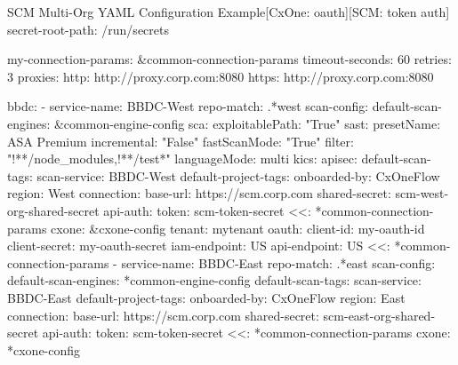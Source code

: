 \begin{code}{SCM Multi-Org YAML Configuration Example}{[CxOne: oauth]}{[SCM: token auth]}
secret-root-path: /run/secrets

my-connection-params: &common-connection-params
    timeout-seconds: 60
    retries: 3
    proxies:
    http: http://proxy.corp.com:8080
    https: http://proxy.corp.com:8080

bbdc:
    - service-name: BBDC-West
      repo-match: .*west
      scan-config: 
          default-scan-engines: &common-engine-config
              sca:
                  exploitablePath: "True"
              sast:
                  presetName: ASA Premium
                  incremental: "False"
                  fastScanMode: "True"
                  filter: "!**/node_modules,!**/test*"
                  languageMode: multi
              kics:
              apisec:
          default-scan-tags:
              scan-service: BBDC-West
          default-project-tags:
              onboarded-by: CxOneFlow
              region: West
      connection:
          base-url: https://scm.corp.com
          shared-secret: scm-west-org-shared-secret
          api-auth:
              token: scm-token-secret
          <<: *common-connection-params
      cxone: &cxone-config
          tenant: mytenant
          oauth:
              client-id: my-oauth-id
              client-secret: my-oauth-secret
          iam-endpoint: US
          api-endpoint: US
          <<: *common-connection-params
    - service-name: BBDC-East
      repo-match: .*east
      scan-config: 
          default-scan-engines: *common-engine-config
          default-scan-tags:
              scan-service: BBDC-East
          default-project-tags:
              onboarded-by: CxOneFlow
              region: East
      connection:
          base-url: https://scm.corp.com
          shared-secret: scm-east-org-shared-secret
          api-auth:
              token: scm-token-secret
          <<: *common-connection-params
      cxone: *cxone-config
\end{code}

